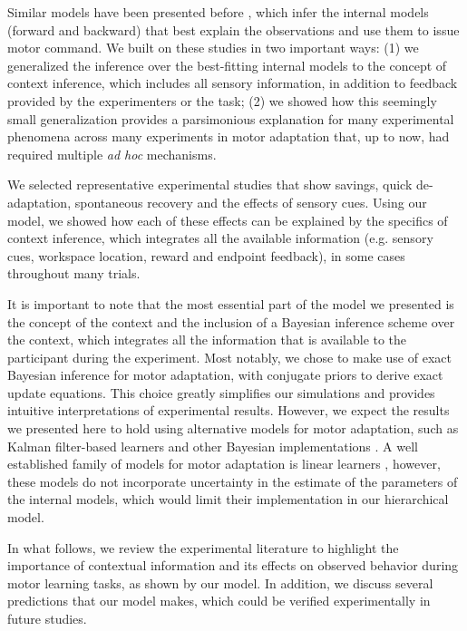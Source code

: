 \documentclass[a4paper,doc,floatsintext,natbib]{apa6}
\begin{document}
Similar models have been presented before \cite[e.g.][]{Wolpert_Multiple_1998,Baddeley_System_2003}, which infer the internal models (forward and backward) that best explain the observations and use them to issue motor command. We built on these studies in two important ways: (1) we generalized the inference over the best-fitting internal models to the concept of context inference, which includes all sensory information, in addition to feedback provided by the experimenters or the task; (2) we showed how this seemingly small generalization provides a parsimonious explanation for many experimental phenomena across many experiments in motor adaptation that, up to now, had required multiple \textit{ad hoc} mechanisms.

We selected representative experimental studies that show savings, quick de-adaptation, spontaneous recovery and the effects of sensory cues. Using our model, we showed how each of these effects can be explained by the specifics of context inference, which integrates all the available information (e.g. sensory cues, workspace location, reward and endpoint feedback), in some cases throughout many trials.

It is important to note that the most essential part of the model we presented is the concept of the context and the inclusion of a Bayesian inference scheme over the context, which integrates all the information that is available to the participant during the experiment. Most notably, we chose to make use of exact Bayesian inference for motor adaptation, with conjugate priors to derive exact update equations. This choice greatly simplifies our simulations and provides intuitive interpretations of experimental results. However, we expect the results we presented here to hold using alternative models for motor adaptation, such as Kalman filter-based learners \cite[e.g.][]{Oh_Minimizing_2019,Baddeley_System_2003} and other Bayesian implementations \cite[e.g.][]{Wolpert_Multiple_1998,Kording_Bayesian_2004}. A well established family of models for motor adaptation is linear learners \cite[e.g.][]{Smith_Interacting_2006,Forano_Timescales_2020,Lee_Dual_2009}, however, these models do not incorporate uncertainty in the estimate of the parameters of the internal models, which would limit their implementation in our hierarchical model.

In what follows, we review the experimental literature to highlight the importance of contextual information and its effects on observed behavior during motor learning tasks, as shown by our model. In addition, we discuss several predictions that our model makes, which could be verified experimentally in future studies.
\end{document}
